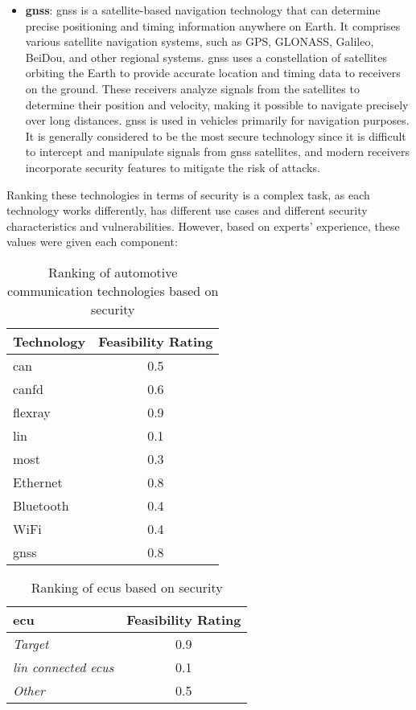 \begin{itemize}
    \item \textbf{\gls{gnss}}: \gls{gnss} is a satellite-based navigation technology that can determine precise positioning and timing information anywhere on Earth. 
    It comprises various satellite navigation systems, such as GPS, GLONASS, Galileo, BeiDou, and other regional systems.
    \gls{gnss} uses a constellation of satellites orbiting the Earth to provide accurate location and timing data to receivers on the ground. 
    These receivers analyze signals from the satellites to determine their position and velocity, making it possible to navigate precisely over long distances.
    \gls{gnss} is used in vehicles primarily for navigation purposes.
    It is generally considered to be the most secure technology since it is difficult to intercept and manipulate signals from \gls{gnss} satellites, 
    and modern receivers incorporate security features to mitigate the risk of attacks.
\end{itemize}
    
Ranking these technologies in terms of security is a complex task, as each technology works differently,
has different use cases and different security characteristics and vulnerabilities.
However, based on experts' experience, these values were given each component:

\begin{table}[h]
    \label{table:bus_rating}
    \centering
    \begin{tabular}{|l|c|}
    \hline
    \textbf{Technology} & \textbf{Feasibility Rating} \\
    \hline
    \gls{can} & 0.5 \\
    \gls{canfd} & 0.6 \\
    \gls{flexray} & 0.9 \\
    \gls{lin} & 0.1 \\
    \gls{most} & 0.3 \\
    Ethernet & 0.8 \\
    Bluetooth & 0.4 \\
    WiFi & 0.4 \\
    \gls{gnss} & 0.8 \\
    \hline
    \end{tabular}
    \caption{Ranking of automotive communication technologies based on security}
\end{table}

\begin{table}[h]
    \label{table:ecu_rating}
    \centering
    \begin{tabular}{|l|c|}
    \hline
    \textbf{\gls{ecu}} & \textbf{Feasibility Rating} \\
    \hline
    \textit{Target} & 0.9 \\
    \textit{\gls{lin} connected \gls{ecu}s} & 0.1 \\
    \textit{Other} & 0.5 \\
    \hline
    \end{tabular}
    \caption{Ranking of \gls{ecu}s based on security}
\end{table}